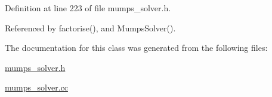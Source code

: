 Definition at line 223 of file mumps\+\_\+solver.\+h.



Referenced by factorise(), and Mumps\+Solver().



The documentation for this class was generated from the following files\+:\begin{DoxyCompactItemize}
\item 
\hyperlink{mumps__solver_8h}{mumps\+\_\+solver.\+h}\item 
\hyperlink{mumps__solver_8cc}{mumps\+\_\+solver.\+cc}\end{DoxyCompactItemize}

